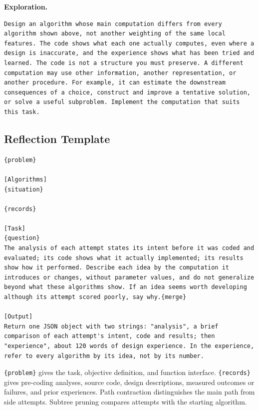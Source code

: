 \documentclass{article}
\begin{document}
\noindent\begin{minipage}{\linewidth}
\textbf{Exploration.}

\begin{verbatim}
Design an algorithm whose main computation differs from every algorithm shown above, not another weighting of the same local features. The code shows what each one actually computes, even where a design is inaccurate, and the experience shows what has been tried and learned. The code is not a structure you must preserve. A different computation may use other information, another representation, or another procedure. For example, it can estimate the downstream consequences of a choice, construct and improve a tentative solution, or solve a useful subproblem. Implement the computation that suits this task.
\end{verbatim}
\end{minipage}\par

\subsection{Reflection Template}\label{reflection-template}

\noindent\begin{minipage}{\linewidth}
\begin{verbatim}
{problem}

[Algorithms]
{situation}

{records}

[Task]
{question}
The analysis of each attempt states its intent before it was coded and evaluated; its code shows what it actually implemented; its results show how it performed. Describe each idea by the computation it introduces or changes, without parameter values, and do not generalize beyond what these algorithms show. If an idea seems worth developing although its attempt scored poorly, say why.{merge}

[Output]
Return one JSON object with two strings: "analysis", a brief comparison of each attempt's intent, code and results; then "experience", about 120 words of design experience. In the experience, refer to every algorithm by its idea, not by its number.
\end{verbatim}
\end{minipage}\par

\texttt{\{problem\}} gives the task, objective definition, and function interface. \texttt{\{records\}} gives pre-coding analyses, source code, design descriptions, measured outcomes or failures, and prior experiences. Path contraction distinguishes the main path from side attempts. Subtree pruning compares attempts with the starting algorithm.
\end{document}
